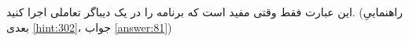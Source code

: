\section{}
\paragraph{}\label{hint:232}
این عبارت فقط وقتی مفید است که برنامه را در یک دیباگر تعاملی اجرا کنید. (راهنماییِ بعدی \ref{hint:302}، جواب \ref{answer:81})